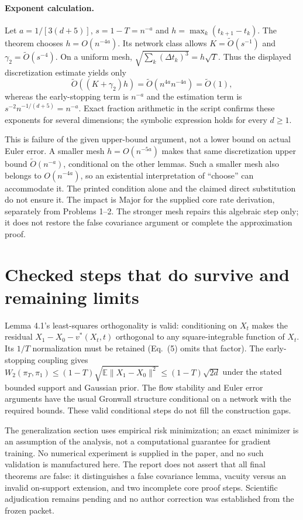 \documentclass[10pt]{article}
\begin{document}
\paragraph*{Exponent calculation.}\mbox{}\par
Let \(a=1/[3(d+5)]\), \(s=1-T=n^{-a}\) and \(h=\max_k(t_{k+1}-t_k)\). The theorem chooses \(h=O(n^{-4a})\). Its network class allows \(K=\widetilde O(s^{-1})\) and \(\gamma_2=\widetilde O(s^{-4})\). On a uniform mesh, \(\sqrt{\sum_k(\Delta t_k)^3}=h\sqrt T\). Thus the displayed discretization estimate yields only \[\widetilde O((K+\gamma_2)h)=\widetilde O(n^{4a}n^{-4a})=\widetilde O(1),\] whereas the early-stopping term is \(n^{-a}\) and the estimation term is \(s^{-2}n^{-1/(d+5)}=n^{-a}\). Exact fraction arithmetic in the script confirms these exponents for several dimensions; the symbolic expression holds for every \(d\geq1\).\par
This is failure of the given upper-bound argument, not a lower bound on actual Euler error. A smaller mesh \(h=O(n^{-5a})\) makes that same discretization upper bound \(\widetilde O(n^{-a})\), conditional on the other lemmas. Such a smaller mesh also belongs to \(O(n^{-4a})\), so an existential interpretation of “choose” can accommodate it. The printed condition alone and the claimed direct substitution do not ensure it. The impact is Major for the supplied core rate derivation, separately from Problems 1–2. The stronger mesh repairs this algebraic step only; it does not restore the false covariance argument or complete the approximation proof.\par
\section*{Checked steps that do survive and remaining limits}
Lemma 4.1’s least-squares orthogonality is valid: conditioning on \(X_t\) makes the residual \(X_1-X_0-v^*(X_t,t)\) orthogonal to any square-integrable function of \(X_t\). Its \(1/T\) normalization must be retained (Eq. (5) omits that factor). The early-stopping coupling gives \(W_2(\pi_T,\pi_1)\leq(1-T)\sqrt{\mathbb E\|X_1-X_0\|^2}\leq(1-T)\sqrt{2d}\) under the stated bounded support and Gaussian prior. The flow stability and Euler error arguments have the usual Gronwall structure conditional on a network with the required bounds. These valid conditional steps do not fill the construction gaps.\par
The generalization section uses empirical risk minimization; an exact minimizer is an assumption of the analysis, not a computational guarantee for gradient training. No numerical experiment is supplied in the paper, and no such validation is manufactured here. The report does not assert that all final theorems are false: it distinguishes a false covariance lemma, vacuity versus an invalid on-support extension, and two incomplete core proof steps. Scientific adjudication remains pending and no author correction was established from the frozen packet.\par
\end{document}
